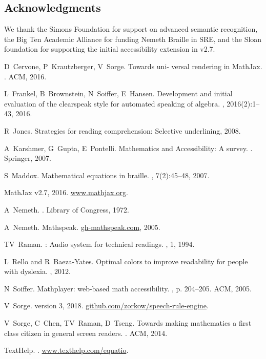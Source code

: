 \documentclass{sig-alternate}
\begin{document}
\subsection*{Acknowledgments}
We thank the Simons Foundation for support on advanced semantic recognition, the
Big Ten Academic Alliance for funding Nemeth Braille in SRE, and the
Sloan foundation for supporting the initial accessibility extension in v2.7.

\begin{thebibliography}{10}

D~Cervone, P~Krautzberger, V~Sorge.
\newblock Towards uni- versal rendering in MathJax.
. ACM, 2016.

L~Frankel, B~Brownstein, N~Soiffer, E~Hansen.
\newblock Development and initial evaluation of the clearspeak style for
  automated speaking of algebra.
, 2016(2):1--43, 2016.

R~Jones.
\newblock Strategies for reading comprehension: Selective underlining, 2008.

A~Karshmer, G~Gupta, E~Pontelli.
\newblock Mathematics and Accessibility: A survey.
. Springer, 2007.

S~Maddox.
\newblock Mathematical equations in braille.
, 7(2):45--48, 2007.

{MathJax} v2.7, 2016.
\newblock \url{www.mathjax.org}.

A~Nemeth.
.
\newblock Library of Congress, 1972.

A~Nemeth.
\newblock Mathspeak.
\newblock \url{gh-mathspeak.com}, 2005.

TV~Raman.
: Audio system for technical readings.
, 1, 1994.

L~Rello and R~Baeza-Yates.
\newblock Optimal colors to improve readability for people with dyslexia.
, 2012.

N~Soiffer.
\newblock Mathplayer: web-based math accessibility.
, p. 204--205. ACM, 2005.

V~Sorge.
 version 3, 2018.
\newblock \url{github.com/zorkow/speech-rule-engine}.

V~Sorge, C~Chen, TV~Raman, D~Tseng.
\newblock Towards making mathematics a first class citizen in general screen
  readers.
. ACM, 2014.

TextHelp.
.
\newblock \url{www.texthelp.com/equatio}.

\end{thebibliography}
\end{document}
